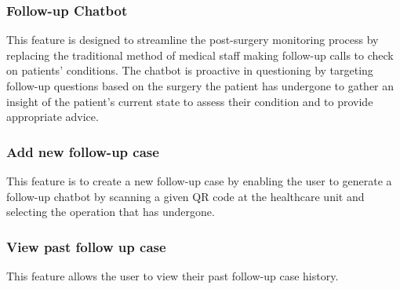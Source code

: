 \documentclass[12pt,oneside,openright,a4paper]{cpe-english-project}
\begin{document}
      \subsubsection{Follow-up Chatbot}
      \qquad This feature is designed to streamline the post-surgery monitoring process by replacing the traditional method of medical staff making follow-up calls to check on patients' conditions. The chatbot is proactive in questioning by targeting follow-up questions based on the surgery the patient has undergone to gather an insight of the patient's current state to assess their condition and to provide appropriate advice. \par
      \subsubsection{Add new follow-up case}
      \qquad This feature is to create a new follow-up case by enabling the user to generate a follow-up chatbot by scanning a given QR code at the healthcare unit and selecting the operation that has undergone. \par
      \subsubsection{View past follow up case}
      \qquad This feature allows the user to view their past follow-up case history. 
\end{document}
